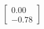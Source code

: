 \documentclass[preview]{standalone}
\begin{document}
\begin{align*}
\begin{bmatrix} 0.00 \\ -0.78 \end{bmatrix}
\end{align*}
\end{document}
